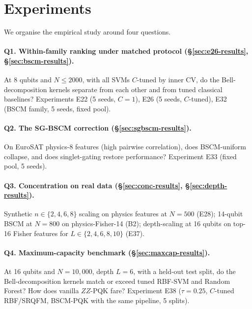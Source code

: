 \documentclass[pdflatex,sn-mathphys-num]{sn-jnl}
\theoremstyle{thmstyleone}
\theoremstyle{thmstyletwo}
\theoremstyle{thmstylethree}
\begin{document}
\section{Experiments}\label{sec:experiments}

We organise the empirical study around four questions.

\paragraph{Q1. Within-family ranking under matched protocol
(\S\ref{sec:e26-results}, \S\ref{sec:bscm-results}).}
At 8 qubits and $N\le 2000$, with all SVMs $C$-tuned by inner CV,
do the Bell-decomposition kernels separate from each other and from
tuned classical baselines? Experiments E22 (5 seeds, $C=1$),
E26 (5 seeds, $C$-tuned), E32 (BSCM family, 5 seeds, fixed pool).

\paragraph{Q2. The SG-BSCM correction
(\S\ref{sec:sgbscm-results}).}
On EuroSAT physics-8 features (high pairwise correlation), does
BSCM-uniform collapse, and does singlet-gating restore performance?
Experiment E33 (fixed pool, 5 seeds).

\paragraph{Q3. Concentration on real data
(\S\ref{sec:conc-results}, \S\ref{sec:depth-results}).}
Synthetic $n\in \{2,4,6,8\}$ scaling on physics features at $N=500$
(E28); 14-qubit BSCM at $N=800$ on physics-Fisher-14 (B2);
depth-scaling at 16 qubits on top-16 Fisher features for $L\in \{2,4,6,8,10\}$
(E37).

\paragraph{Q4. Maximum-capacity benchmark
(\S\ref{sec:maxcap-results}).}
At 16 qubits and $N=10{,}000$, depth $L=6$, with a held-out
test split, do the Bell-decomposition kernels match or exceed tuned
RBF-SVM and Random Forest? How does vanilla $ZZ$-PQK fare? Experiment E38
($\tau=0.25$, $C$-tuned RBF/SRQFM, BSCM-PQK with the same pipeline,
5 splits).
\end{document}
